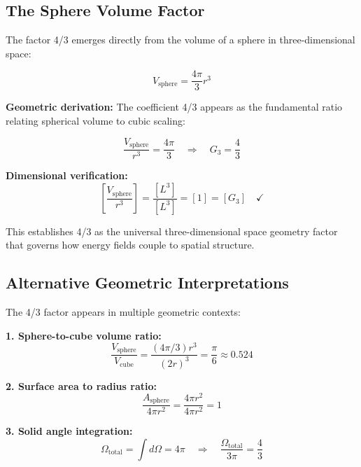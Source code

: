 \documentclass[12pt,a4paper]{report}
\begin{document}
	\subsection{The Sphere Volume Factor}
	\label{subsec:sphere_volume_factor}
	
	The factor 4/3 emerges directly from the volume of a sphere in three-dimensional space:
	
	\begin{equation}
		V_{\text{sphere}} = \frac{4\pi}{3} r^3
	\end{equation}
	
	\textbf{Geometric derivation:}
	The coefficient 4/3 appears as the fundamental ratio relating spherical volume to cubic scaling:
	
	\begin{equation}
		\frac{V_{\text{sphere}}}{r^3} = \frac{4\pi}{3} \quad \Rightarrow \quad G_3 = \frac{4}{3}
	\end{equation}
	
	\textbf{Dimensional verification:}
	\begin{equation}
		\left[\frac{V_{\text{sphere}}}{r^3}\right] = \frac{[L^3]}{[L^3]} = [1] = [G_3] \quad \checkmark
	\end{equation}
	
	This establishes 4/3 as the universal three-dimensional space geometry factor that governs how energy fields couple to spatial structure.
	
	\subsection{Alternative Geometric Interpretations}
	\label{subsec:alternative_interpretations}
	
	The 4/3 factor appears in multiple geometric contexts:
	
	\textbf{1. Sphere-to-cube volume ratio:}
	\begin{equation}
		\frac{V_{\text{sphere}}}{V_{\text{cube}}} = \frac{(4\pi/3)r^3}{(2r)^3} = \frac{\pi}{6} \approx 0.524
	\end{equation}
	
	\textbf{2. Surface area to radius ratio:}
	\begin{equation}
		\frac{A_{\text{sphere}}}{4\pi r^2} = \frac{4\pi r^2}{4\pi r^2} = 1
	\end{equation}
	
	\textbf{3. Solid angle integration:}
	\begin{equation}
		\Omega_{\text{total}} = \int d\Omega = 4\pi \quad \Rightarrow \quad \frac{\Omega_{\text{total}}}{3\pi} = \frac{4}{3}
	\end{equation}
	
\end{document}
